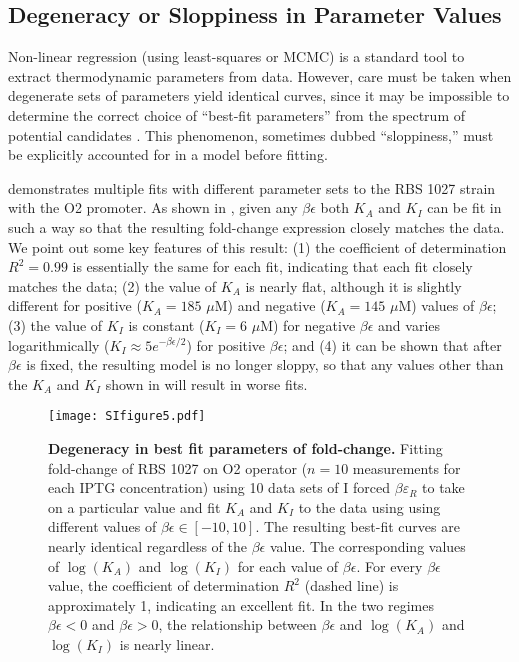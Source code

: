 \subsection{Degeneracy or Sloppiness in Parameter Values}

Non-linear regression (using least-squares or MCMC) is a standard tool to
extract thermodynamic parameters from data. However, care must be taken when
degenerate sets of parameters yield identical curves, since it may be impossible
to determine the correct choice of ``best-fit parameters'' from the spectrum of
potential candidates \cite{Transtrum2015}. This phenomenon, sometimes dubbed
``sloppiness,'' must be explicitly accounted for in a model before fitting.

\fref[SIfig5] demonstrates multiple fits with different parameter sets
to the RBS 1027 strain with the O2 promoter. As shown in
\fref[SIfig5], given any $\beta \epsilon$ both $K_A$ and $K_I$ can be
fit in such a way so that the resulting fold-change expression closely matches
the data. We point out some key features of this result: (1) the coefficient of
determination $R^2 = 0.99$ is essentially the same for each fit, indicating that
each fit closely matches the data; (2) the value of $K_A$ is nearly flat,
although it is slightly different for positive ($K_A = 185\,\,\mu\text{M}$) and
negative ($K_A = 145\,\,\mu\text{M}$) values of $\beta \epsilon$; (3) the value
of $K_I$ is constant ($K_I = 6\,\,\mu\text{M}$) for negative $\beta \epsilon$
and varies logarithmically ($K_I \approx 5 e^{-\beta \epsilon/2}$) for positive
$\beta \epsilon$; and (4) it can be shown that after $\beta \epsilon$ is fixed,
the resulting model is no longer sloppy, so that any values other than the $K_A$
and $K_I$ shown in \fref[SIfig5] will result in worse fits.

\begin{figure}[h]
	\centering \texttt{[image: SIfigure5.pdf]} \caption{{\bf Degeneracy in best fit
			parameters of fold-change.}  Fitting fold-change of RBS 1027 on
		O2 operator ($n=10$ measurements for each IPTG concentration) using 10 data
		sets of I forced $\beta \varepsilon_R$ to take on a particular value and fit
		$K_A$ and $K_I$ to the data using \eref[SIFullFoldChangeExpression] using
		different values of $\beta \epsilon \in [-10,10]$. The resulting best-fit
		curves are nearly identical regardless of the $\beta \epsilon$ value.
		 The corresponding values of $\log\left( K_A \right)$ and $\log
		\left( K_I \right)$ for each value of $\beta \epsilon$. For every $\beta
		\epsilon$ value, the coefficient of determination $R^2$ (dashed line) is
		approximately 1, indicating an excellent fit. In the two regimes $\beta
		\epsilon < 0$ and $\beta \epsilon > 0$, the relationship between $\beta
		\epsilon$ and $\log\left( K_A \right)$ and $\log \left( K_I \right)$ is nearly
		linear. }
	\label{SIfig5}
\end{figure}

